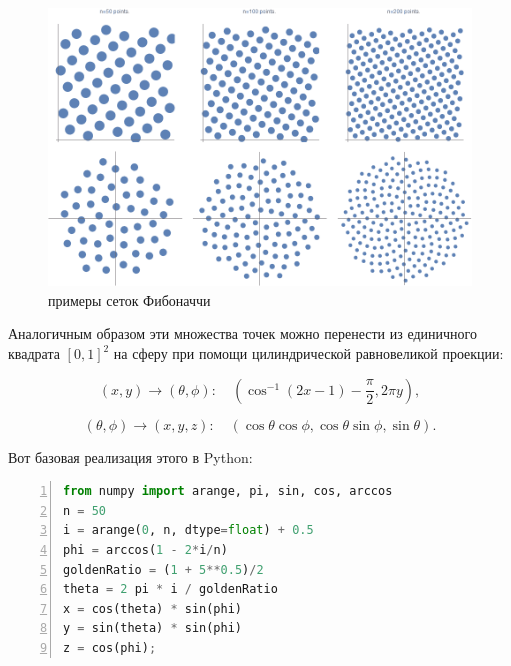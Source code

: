 \documentclass[12pt, a4paper]{article}
\begin{document}
\begin{figure}[H]
    \centering
    \includegraphics[width=\textwidth]{images/1.png}
    \caption{примеры сеток Фибоначчи}
\end{figure}

\newpage

Аналогичным образом эти множества точек можно перенести из единичного квадрата $[0, 1]^2$ на сферу при помощи цилиндрической равновеликой проекции:

\begin{displaymath}
	(x,y) \rightarrow (\theta, \phi) : \quad \left( \cos^{-1}(2x-1) - \frac{\pi}{2}, 2\pi y \right),
\end{displaymath}

\begin{displaymath}
	(\theta,\phi) \rightarrow (x,y,z) : \quad \left (\cos\theta \cos\phi, \cos \theta \sin \phi, \sin \theta \right).
\end{displaymath}

Вот базовая реализация этого в Python:

\begin{lstlisting}[language=Python, numbers=left, xleftmargin=6mm]
from numpy import arange, pi, sin, cos, arccos
n = 50
i = arange(0, n, dtype=float) + 0.5
phi = arccos(1 - 2*i/n)
goldenRatio = (1 + 5**0.5)/2
theta = 2 pi * i / goldenRatio
x = cos(theta) * sin(phi)
y = sin(theta) * sin(phi)
z = cos(phi);
\end{lstlisting}
\end{document}
